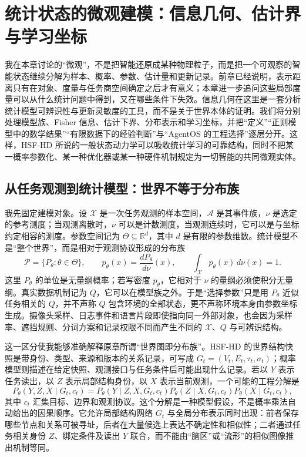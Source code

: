 \chapter{统计状态的微观建模：信息几何、估计界与学习坐标}
\label{chp:microscopic_origins}

我在本章讨论的“微观”，不是把智能还原成某种物理粒子，而是把一个可观察的智能状态继续分解为样本、概率、参数、估计量和更新记录。前章已经说明，表示距离只有在对象、度量与任务商空间确定之后才有意义；本章进一步追问这些局部度量可以从什么统计问题中得到，又在哪些条件下失效。信息几何在这里是一套分析统计模型可辨识性与更新灵敏度的工具，而不是关于世界本体的证明。我们将分别处理模型族、Fisher 信息、估计下界、分布表示和学习坐标，并把“定义”“正则模型中的数学结果”“有限数据下的经验判断”与“AgentOS 的工程选择”逐层分开。这样，HSF-HD 所说的一般状态动力学可以吸收统计学习的可靠结构，同时不把某一概率参数化、某一种优化器或某一种硬件机制规定为一切智能的共同微观实体。

\section{从任务观测到统计模型：世界不等于分布族}
\label{sec:section_8204}

我先固定建模对象。设 $\mathcal X$ 是一次任务观测的样本空间，$\mathcal A$ 是其事件族，$\nu$ 是选定的参考测度；当观测离散时，$\nu$ 可以是计数测度，当观测连续时，它可以是与坐标约定相容的测度。参数空间记为 $\Theta\subseteq\mathbb R^d$，其中 $d$ 是有限的参数维数。统计模型不是“整个世界”，而是相对于观测协议形成的分布族
\begin{equation}
    \mathcal P=\{P_\theta:\theta\in\Theta\},\qquad
    p_\theta(x)=\frac{dP_\theta}{d\nu}(x),\qquad
    \int_{\mathcal X}p_\theta(x)\,d\nu(x)=1.
\end{equation}
这里 $P_\theta$ 的单位是无量纲概率；若写密度 $p_\theta$，它相对于 $\nu$ 的量纲必须使积分无量纲。真实数据机制记为 $Q$，它可以在模型族之外。于是“选择参数”只是用 $P_\theta$ 近似任务相关的 $Q$，并不声称 $Q$ 包含环境的全部状态，更不声称环境本身由参数坐标生成。摄像头采样、日志事件和语言片段即使指向同一外部对象，也会因为采样率、遮挡规则、分词方案和记录权限不同而产生不同的 $\mathcal X$、$Q$ 与可辨识结构。

这一区分使我能够准确解释原章所谓“世界图即分布族”。HSF-HD 的世界结构快照是带身份、类型、来源和版本的关系记录，可写成 $G_t=(V_t,E_t,\tau_t,\sigma_t)$；概率模型则描述在给定快照、观测接口与任务条件后可能出现什么记录。若以 $Y$ 表示任务读出，以 $Z$ 表示局部结构身份，以 $X$ 表示当前观测，一个可能的工程分解是
\begin{equation}
    P_\theta(Y,Z,X\mid G_t,c_t)
    =P_\theta(Y\mid Z,X,G_t,c_t)
     P_\theta(Z\mid X,G_t,c_t)
     P_\theta(X\mid G_t,c_t),
\end{equation}
其中 $c_t$ 汇集目标、边界和观测协议。这个分解是一种模型假设，不是概率乘法自动给出的因果顺序。它允许局部结构网络 $G_t$ 与全局分布表示同时出现：前者保存哪些节点和关系可被寻址，后者在大量候选上表达不确定性和相似性；二者通过任务相关身份 $Z$、绑定条件及读出 $Y$ 联合，而不能由“脑区”或“流形”的相似图像推出机制等同。

